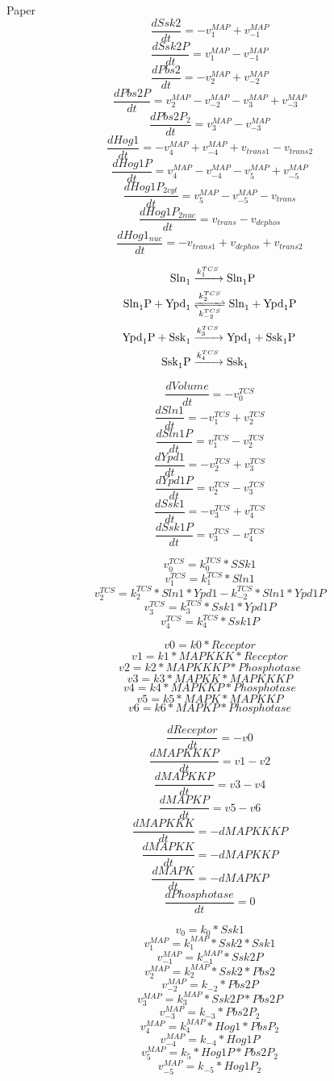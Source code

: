 \documentclass[11pt]{amsart}
\begin{document}
Paper
\[\frac{dSsk2}{dt} = -v_1^{MAP} + v_{-1}^{MAP} \]
\[\frac{dSsk2P}{dt} = v_1^{MAP} - v_{-1}^{MAP} \]
\[\frac{dPbs2}{dt} = -v_2^{MAP} + v_{-2}^{MAP}\]
\[\frac{dPbs2P}{dt} = v_2^{MAP} - v_{-2}^{MAP} - v_3^{MAP} + v_{-3}^{MAP}\]
\[\frac{dPbs2P_2}{dt} = v_3^{MAP} - v_{-3}^{MAP} \]
\[\frac{dHog1}{dt} = -v_4^{MAP} + v_{-4}^{MAP} + v_{trans1} - v_{trans2}\]
\[\frac{dHog1P}{dt} = v_4^{MAP} - v_{-4}^{MAP} - v_{5}^{MAP} + v_{-5}^{MAP} \]
\[\frac{dHog1P_{2cyt}}{dt} =  v_{5}^{MAP} - v_{-5}^{MAP} - v_{trans}\]
\[\frac{dHog1P_{2nuc}}{dt} = v_{trans} - v_{dephos}\]
\[\frac{dHog1_{nuc}}{dt} = -v_{trans1} + v_{dephos} + v_{trans2} \]


\clearpage

\begin{align}
\cee{Sln1 &->[k_1^{TCS}]Sln1P} \\
\cee{Sln1P + Ypd1 &<=>[k_{2}^{TCS}][k_{-2}^{TCS}] Sln1 + Ypd1P} \\
\cee{Ypd1P + Ssk1 &->[k_3^{TCS}] Ypd1 + Ssk1P} \\
\cee{Ssk1P &->[k_4^{TCS}] Ssk1}
\end{align}

\[\frac{dVolume}{dt} = -v_0^{TCS}\]
\[\frac{dSln1}{dt} = -v_1^{TCS} + v_2^{TCS}\]
\[\frac{dSln1P}{dt} = v_1^{TCS} - v_2^{TCS}\]
\[\frac{dYpd1}{dt} = -v_2^{TCS} + v_3^{TCS}\]
\[\frac{dYpd1P}{dt} = v_2^{TCS} - v_3^{TCS}\]
\[\frac{dSsk1}{dt} = -v_3^{TCS} + v_4^{TCS}\]
\[\frac{dSsk1P}{dt} = v_3^{TCS} - v_4^{TCS}\]

\[v_0^{TCS} = k_0^{TCS}*SSk1\]
\[v_1^{TCS} = k_1^{TCS}*Sln1\]
\[v_2^{TCS} = k_2^{TCS}*Sln1*Ypd1 - k_{-2}^{TCS}*Sln1*Ypd1P\]
\[v_3^{TCS} = k_3^{TCS}*Ssk1*Ypd1P\]
\[v_4^{TCS} = k_4^{TCS}*Ssk1P\]

\clearpage
\[v0 = k0*Receptor\]
\[v1 = k1*MAPKKK*Receptor\]
\[v2 = k2*MAPKKKP*Phosphotase\]
\[v3 = k3*MAPKK*MAPKKKP    \]
\[v4 = k4*MAPKKP*Phosphotase\]
\[v5 = k5*MAPK*MAPKKP    \]
\[v6 = k6*MAPKP*Phosphotase\]

\[\frac{dReceptor}{dt} = -v0\]
\[\frac{dMAPKKKP}{dt} = v1 - v2\]
\[\frac{dMAPKKP}{dt} = v3 - v4\]
\[\frac{dMAPKP}{dt} = v5 - v6\]
\[\frac{dMAPKKK}{dt} = -dMAPKKKP\]
\[\frac{dMAPKK}{dt} = -dMAPKKP\]
\[\frac{dMAPK}{dt} = -dMAPKP   \]
\[\frac{dPhosphotase}{dt} = 0\]



\clearpage
\[v_0 = k_0*Ssk1\]
\[v_1^{MAP} = k_1^{MAP}*Ssk2*Ssk1\]
\[v_{-1}^{MAP} =k_{-1}^{MAP}*Ssk2P \]
\[v_2^{MAP} = k_2^{MAP}*Ssk2*Pbs2\]
\[v_{-2}^{MAP} = k_{-2}*Pbs2P\]
\[v_3^{MAP} = k_3^{MAP}*Ssk2P*Pbs2P\]
\[v_{-3}^{MAP} = k_{-3}*Pbs2P_2\]
\[v_4^{MAP} = k_4^{MAP}*Hog1*PbsP_2\]
\[v_{-4}^{MAP} = k_{-4}*Hog1P\]
\[v_{5}^{MAP} = k_5*Hog1P*Pbs2P_2\]
\[v_{-5}^{MAP} = k_{-5}*Hog1P_2\]
\end{document}
